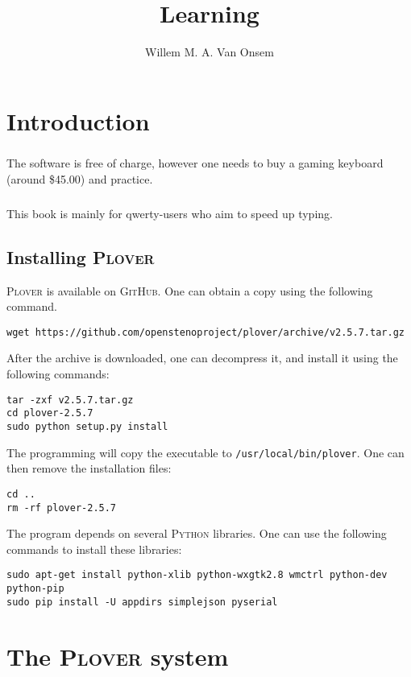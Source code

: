 \documentclass[titlepage]{book}
\title{Learning \plover{}}
\author{Willem M. A. Van Onsem}
\newcommand{\plover}[0]{\textsc{Plover}}
\newcommand{\github}[0]{\textsc{GitHub}}
\newcommand{\python}[0]{\textsc{Python}}
\begin{document}
\begin{titlepage}
\maketitle
\end{titlepage}
\chapter{Introduction}
\paragraph{}The software is free of charge, however one needs to buy a gaming keyboard (around \$45.00) and practice.
\paragraph{}This book is mainly for qwerty-users who aim to speed up typing.
\section{Installing \plover{}}
\plover{} is available on \github{}. One can obtain a copy using the following command.
\begin{verbatim}
wget https://github.com/openstenoproject/plover/archive/v2.5.7.tar.gz
\end{verbatim}
After the archive is downloaded, one can decompress it, and install it using the following commands:
\begin{verbatim}
tar -zxf v2.5.7.tar.gz
cd plover-2.5.7
sudo python setup.py install
\end{verbatim}
The programming will copy the executable to \verb+/usr/local/bin/plover+. One can then remove the installation files:
\begin{verbatim}
cd ..
rm -rf plover-2.5.7
\end{verbatim}
The program depends on several \python{} libraries. One can use the following commands to install these libraries:
\begin{verbatim}
sudo apt-get install python-xlib python-wxgtk2.8 wmctrl python-dev python-pip
sudo pip install -U appdirs simplejson pyserial
\end{verbatim}
\chapter{The \plover{} system}
\end{document}
